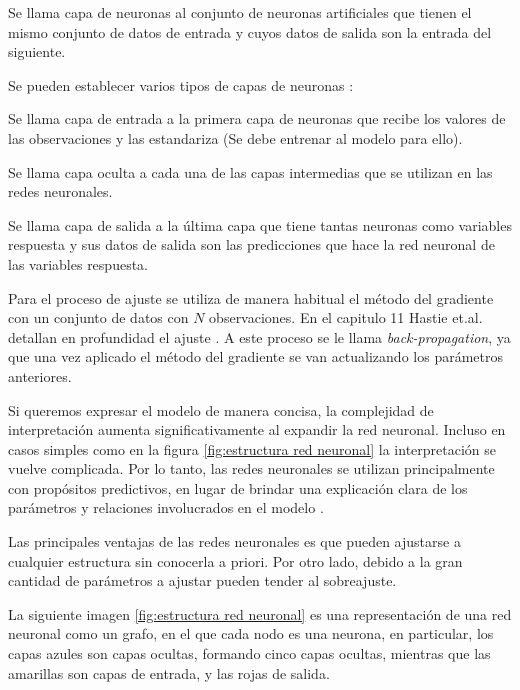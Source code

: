 \begin{defi}
Se llama capa de neuronas al conjunto de neuronas artificiales que tienen el mismo conjunto de datos de entrada y cuyos datos de salida son la entrada del siguiente.
\end{defi}
\noindent Se pueden establecer varios tipos de capas de neuronas \cite{Neural Designer}:
\begin{defi}
Se llama capa de entrada a la primera capa de neuronas que recibe los valores de las observaciones y las estandariza (Se debe entrenar al modelo para ello).
\end{defi}
\begin{defi}
Se llama capa oculta a cada una de las capas intermedias que se utilizan en las redes neuronales. 
\end{defi}

\begin{defi}
Se llama capa de salida a la última capa que tiene tantas neuronas como variables respuesta y sus datos de salida son las predicciones que hace la red neuronal de las variables respuesta. 
\end{defi}

\noindent Para el proceso de ajuste se utiliza de manera habitual el método del gradiente con un conjunto de datos con $N$ observaciones. En el capitulo  11 Hastie et.al.  detallan en profundidad el ajuste \cite{Hastie 2001}. A este proceso se le llama \emph{back-propagation}, ya que una vez aplicado el método del gradiente se van actualizando los parámetros anteriores. 

\noindent Si queremos expresar el modelo de manera concisa, la complejidad de interpretación aumenta significativamente al expandir la red neuronal. Incluso en casos simples como en la figura  \ref{fig:estructura red neuronal} la interpretación se vuelve complicada. Por lo tanto, las redes neuronales se utilizan principalmente con propósitos predictivos, en lugar de brindar una explicación clara de los parámetros y relaciones involucrados en el modelo \cite{Hastie 2001, James 2013}.

\noindent Las principales ventajas de las redes neuronales es que pueden ajustarse a cualquier estructura sin conocerla a priori. Por otro lado, debido a la gran cantidad de parámetros a ajustar pueden tender al sobreajuste.

\noindent La siguiente imagen \ref{fig:estructura red neuronal} es una representación de una red neuronal como un grafo, en el que cada nodo es una neurona, en particular, los capas azules son capas ocultas, formando cinco capas ocultas, mientras que las amarillas son capas de entrada, y las rojas de salida. 

